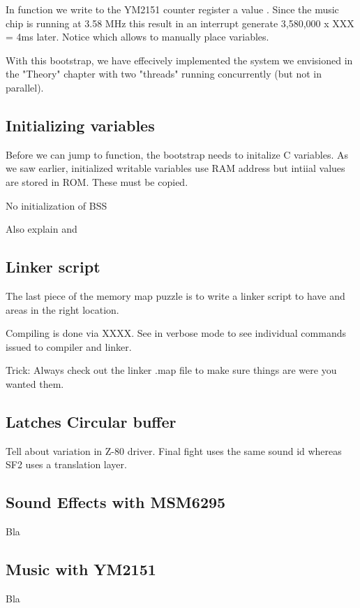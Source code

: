 

In function  we write to the YM2151 counter register a value . Since the music chip is running at 3.58 MHz this result in an interrupt generate 3,580,000 x XXX = 4ms later. Notice  which allows to manually place variables.

With this bootstrap, we have effecively implemented the system we envisioned in the "Theory" chapter with two "threads" running concurrently (but not in parallel).

\subsection{Initializing variables}
Before we can jump to  function, the bootstrap needs to initalize C variables. As we saw earlier, initialized writable variables use RAM address but intiial values are stored in ROM. These must be copied.




 

No initialization of BSS

Also explain  and 

\subsection{Linker script}

The last piece of the memory map puzzle is to write a linker script to have  and  areas in the right location.



Compiling is done via XXXX. See  in verbose mode to see individual commands issued to  compiler and  linker.

Trick: Always check out the linker .map file to make sure things are were you wanted them.

\subsection{Latches Circular buffer}

Tell about variation in Z-80 driver. Final fight uses the same sound id whereas SF2 uses a translation layer.


\subsection{Sound Effects with MSM6295}
Bla

\subsection{Music with YM2151}
Bla
